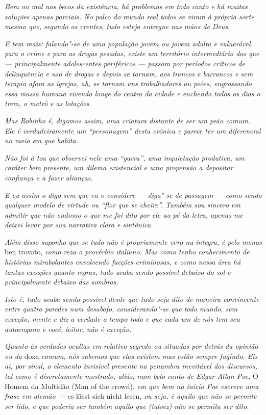 \emph{Bem ou mal nos becos da existência, há problemas em todo canto e
há muitas soluções apenas parciais. No palco do mundo real todos se
viram à própria sorte mesmo que, segundo os crentes, tudo esteja
entregue nas mãos de Deus.}

\emph{E tem mais: falando"-se de uma população jovem ou jovem adulta e
vulnerável para o crime e para as drogas pesadas, existe um território
intermediário dos que --- principalmente adolescentes periféricos ---
passam por períodos críticos de delinquência e uso de drogas e depois se
tornam, aos trancos e barrancos e sem terapia afora as igrejas, ah, se
tornam uns trabalhadores ou peões, engrossando essa massa humana vivendo
longe do centro da cidade e enchendo todos os dias o trem, o metrô e as
lotações.}

\emph{Mas Robinho é, digamos assim, uma criatura distante de ser um
peão comum. Ele é verdadeiramente um ``personagem'' desta crônica e
parece ter um diferencial no meio em que habita.}

\emph{Não foi à toa que observei nele uma ``garra'', uma inquietação
produtiva, um caráter bem presente, um dilema existencial e uma
propensão a depositar confiança e a fazer alianças.}

\emph{E eu assim o digo sem que eu o considere --- diga"-se de passagem
--- como sendo qualquer modelo de virtude ou ``flor que se cheire''.
Também sou sincero em admitir que não endosso o que me foi dito por ele
ao pé da letra, apenas me deixei levar por sua narrativa clara e
sintônica.}

\emph{Além disso suponho que se tudo não é propriamente vero na íntegra,
é pelo menos} ben trovato, \emph{como reza o provérbio italiano. Mas como tenho
conhecimento de histórias mirabolantes envolvendo facções criminosas, e
como nessa área há tantas exceções quanto regras, tudo acaba sendo
possível debaixo do sol e principalmente debaixo das sombras.}

\emph{Isto é, tudo acaba sendo possível desde que tudo seja dito de
maneira convincente entre quatro paredes num desabafo, considerando"-se que
todo mundo, sem exceção, mente e diz a verdade o tempo todo e que cada
um de nós tem seu autoengano e você, leitor, não é exceção.}

\emph{Quanto às verdades ocultas em relativo segredo ou situadas por
detrás da opinião ou da} doxa \emph{comum, nós sabemos que elas existem mas
estão sempre fugindo. Eis aí, por sinal, o elemento invisível presente
na penumbra inevitável dos discursos, tal como é discretamente mostrado,
aliás, num belo conto de Edgar Allan Poe,} O Homem da Multidão (Man of
the crowd), \emph{em que bem no início Poe escreve uma frase em alemão ---} es
lässt sich nicht lesen, \emph{ou seja, é aquilo que não se permite ser lido, e
que poderia ser também aquilo que (talvez) não se permita ser dito.}

